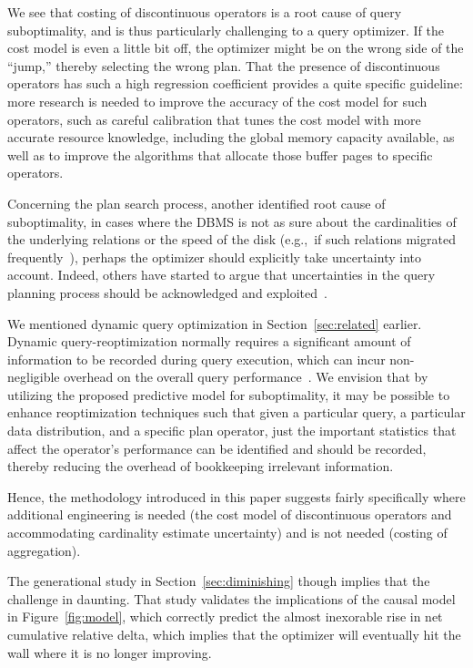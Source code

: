\documentclass[prodmode,acmtods]{acmsmall}
\begin{document}
We see that costing of \hbox{discontinuous} operators is a
root cause of query suboptimality, and is thus particularly challenging to a
query optimizer. If the cost model is even a little bit off, the optimizer
might be on the wrong side of the ``jump,'' thereby selecting the wrong
plan.  That the presence of discontinuous operators has such a high
regression coefficient provides a quite specific guideline: more research is
needed to improve the accuracy of the cost model for such operators, such as
careful calibration that tunes the cost model with more accurate resource
knowledge, including the global memory capacity available, as well as to
improve the algorithms that allocate those buffer pages to specific
operators.

Concerning the plan search
process, another identified root cause of suboptimality, in cases
where the \hbox{DBMS} is not as sure about the cardinalities of the underlying
relations or the speed of the disk (e.g.,~if such relations migrated
frequently~\cite{reiss03}), 
perhaps the optimizer should
explicitly take uncertainty into account. Indeed, others have started to
\hbox{argue} that uncertainties in the query planning process should be
acknowledged and exploited~\cite{Babcock05}.

We mentioned dynamic query optimization in Section~\ref{sec:related}
earlier.  Dynamic query-reoptimization normally requires a significant
amount of information to be recorded during query execution, which can incur
non-negligible overhead on the overall query
performance~\cite{Avnur,kabra98}.  We envision that by utilizing the
proposed predictive model for suboptimality, it may be possible to enhance
reoptimization techniques such that given a particular query, a particular
data distribution, and a specific plan operator, just the important
statistics that affect the operator's performance can be identified and
should be recorded, thereby reducing the overhead of bookkeeping irrelevant
\hbox{information}.

Hence, the methodology introduced in this paper suggests fairly specifically where additional
engineering is needed (the cost model of discontinuous
operators and accommodating cardinality estimate uncertainty) and is not
needed (costing of aggregation).

The generational study in Section~\ref{sec:diminishing} though implies that
the challenge in daunting. That study validates the implications of the
causal model in Figure~\ref{fig:model}, which correctly predict  the almost
inexorable rise in net cumulative relative delta, which implies that the
optimizer will eventually hit the wall where it is no longer improving.
\end{document}
